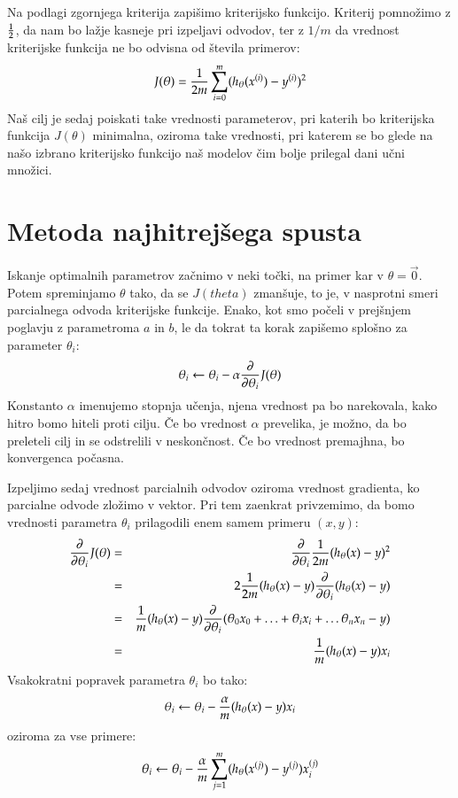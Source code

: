 Na podlagi zgornjega kriterija zapišimo kriterijsko funkcijo. Kriterij
pomnožimo z $1\over 2$, da nam bo lažje kasneje pri izpeljavi odvodov, ter z $1/m$ da vrednost kriterijske funkcija ne bo odvisna od števila primerov:
%
\begin{equation}
J(\theta)={1\over 2m}\sum_{i=0}^m(h_\theta(x^{(i)})-y^{(i)})^2
\end{equation}
%
Naš cilj je sedaj poiskati take vrednosti parameterov, pri katerih bo
kriterijska funkcija $J(\theta)$ minimalna, oziroma take vrednosti,
pri katerem se bo glede na našo izbrano kriterijsko funkcijo naš
modelov čim bolje prilegal dani učni množici. 

\section{Metoda najhitrejšega spusta}

Iskanje optimalnih parametrov začnimo v neki točki, na primer kar v
$\theta=\vec{0}$. Potem spreminjamo $\theta$ tako, da se $J(theta)$
zmanšuje, to je, v nasprotni smeri parcialnega odvoda kriterijske
funkcije. Enako, kot smo počeli v prejšnjem poglavju z parametroma $a$
in $b$, le da tokrat ta korak zapišemo splošno za parameter $\theta_i$:
\begin{equation}
  \theta_i\leftarrow\theta_i-\alpha{\partial\over\partial\theta_i}J(\theta)
\end{equation}
%
Konstanto $\alpha$ imenujemo stopnja učenja, njena vrednost pa bo
narekovala, kako hitro bomo hiteli proti cilju. Če bo vrednost
$\alpha$ prevelika, je možno, da bo preleteli cilj in se odstrelili v
neskončnost. Če bo vrednost premajhna, bo konvergenca počasna.

Izpeljimo sedaj vrednost parcialnih odvodov oziroma vrednost
gradienta, ko parcialne odvode zložimo v vektor. Pri tem zaenkrat privzemimo, da bomo vrednosti parametra $\theta_i$ prilagodili enem samem primeru $(x,y)$:
%
\begin{eqnarray}
{\partial\over\partial\theta_i} J(\theta) & = & {\partial\over\partial\theta_i} {1\over 2m}(h_\theta(x)-y)^2 \\
& = & 2{1\over 2m}(h_\theta(x)-y){\partial\over\partial\theta_i}(h_\theta(x)-y) \\
& = & {1\over m}(h_\theta(x)-y){\partial\over\partial\theta_i}(\theta_0 x_0 + \ldots + \theta_i x_i + \ldots \theta_n x_n - y) \\
& = & {1\over m}(h_\theta(x)-y)x_i
\end{eqnarray}
%
Vsakokratni popravek parametra $\theta_i$ bo tako:
\begin{equation}
  \theta_i\leftarrow\theta_i-{\alpha\over m}(h_\theta(x)-y)x_i
\end{equation}
oziroma za vse primere:
\begin{equation}
  \theta_i\leftarrow\theta_i-{\alpha\over m}\sum_{j=1}^m(h_\theta(x^{(j)})-y^{(j)})x_i^{(j)}
\end{equation}

